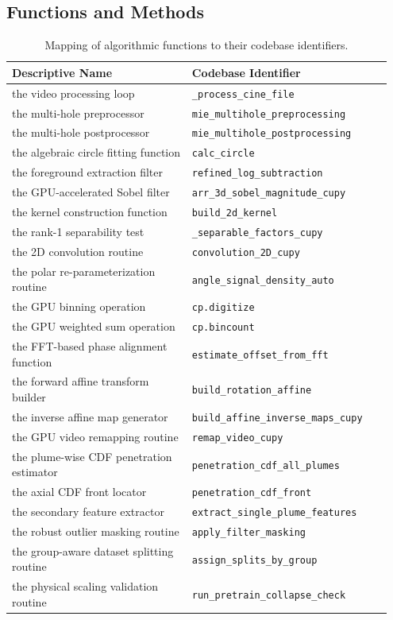 \documentclass[english, 12pt, a4paper, elec, utf8, a-2b, online]{aaltothesis}
\begin{document}
\subsection{Functions and Methods}

\begin{table}[h]
\centering
\begin{tabular}{p{0.45\linewidth} p{0.5\linewidth}}
\toprule
\textbf{Descriptive Name} & \textbf{Codebase Identifier} \\
\midrule
the video processing loop & \texttt{\_process\_cine\_file} \\
the multi-hole preprocessor & \texttt{mie\_multihole\_preprocessing} \\
the multi-hole postprocessor & \texttt{mie\_multihole\_postprocessing} \\
the algebraic circle fitting function & \texttt{calc\_circle} \\
the foreground extraction filter & \texttt{refined\_log\_subtraction} \\
the GPU-accelerated Sobel filter & \texttt{arr\_3d\_sobel\_magnitude\_cupy} \\
the kernel construction function & \texttt{build\_2d\_kernel} \\
the rank-1 separability test & \texttt{\_separable\_factors\_cupy} \\
the 2D convolution routine & \texttt{convolution\_2D\_cupy} \\
the polar re-parameterization routine & \texttt{angle\_signal\_density\_auto} \\
the GPU binning operation & \texttt{cp.digitize} \\
the GPU weighted sum operation & \texttt{cp.bincount} \\
the FFT-based phase alignment function & \texttt{estimate\_offset\_from\_fft} \\
the forward affine transform builder & \texttt{build\_rotation\_affine} \\
the inverse affine map generator & \texttt{build\_affine\_inverse\_maps\_cupy} \\
the GPU video remapping routine & \texttt{remap\_video\_cupy} \\
the plume-wise CDF penetration estimator & \texttt{penetration\_cdf\_all\_plumes} \\
the axial CDF front locator & \texttt{penetration\_cdf\_front} \\
the secondary feature extractor & \texttt{extract\_single\_plume\_features} \\
the robust outlier masking routine & \texttt{apply\_filter\_masking} \\
the group-aware dataset splitting routine & \texttt{assign\_splits\_by\_group} \\
the physical scaling validation routine & \texttt{run\_pretrain\_collapse\_check} \\
\bottomrule
\end{tabular}
\caption{Mapping of algorithmic functions to their codebase identifiers.}
\end{table}
\end{document}
